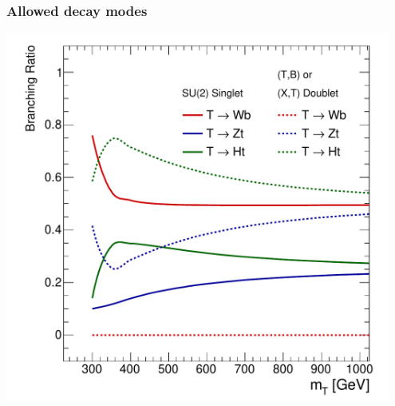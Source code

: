 
\begin{frame}\frametitle{Allowed decay modes}
\centering\myskip

\begin{minipage}{.4\textwidth}\centering
\scriptsize
  
\end{minipage}\begin{minipage}{.6\textwidth}\centering
  \includegraphics[width=0.95\textwidth]{../vlq_analysis/figures/fig_02a.pdf}
\end{minipage}

\end{frame}







